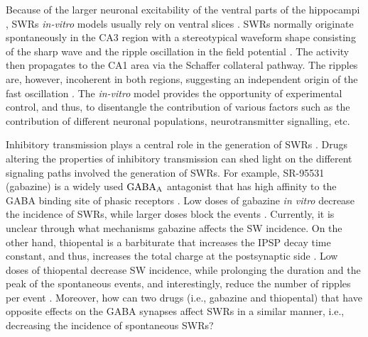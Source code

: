     Because of the larger neuronal excitability of the ventral parts of the
    hippocampi \citep{Dougherty2012}, SWRs \textit{in-vitro} models usually
    rely on ventral slices \citep[e.g.,][]{Maier2003, Nimmrich2005}. SWRs
    normally originate spontaneously in the CA3 region with a stereotypical
    waveform shape consisting of the sharp wave and the ripple oscillation in
    the field potential \citep{Csicsvari1999}. The activity then propagates to
    the CA1 area via the Schaffer collateral pathway. The ripples are, however,
    incoherent in both regions, suggesting an independent origin of the fast
    oscillation \citep{Csicsvari2000, Both2008}. The \textit{in-vitro} model
    provides the opportunity of experimental control, and thus, to disentangle
    the contribution of various factors such as the contribution of different
    neuronal populations, neurotransmitter signalling, etc.
    
    Inhibitory transmission plays a central role in the generation of SWRs
    \citep{Maier2003, Schlingloff2014}. Drugs altering the properties of
    inhibitory transmission can shed light on the different signaling paths
    involved the generation of SWRs. For example, SR-95531 (gabazine) is a
    widely used $\rm GABA_A$ antagonist that has high affinity to the GABA
    binding site of phasic receptors \citep{Ueno1997, Bai2001, Yeung2003}.  Low
    doses of gabazine \textit{in vitro} decrease the incidence of SWRs, while
    larger doses block the events \citep{Maier2003, Nimmrich2005,
    Ellender2010}. Currently, it is unclear through what mechanisms gabazine
    affects the SW incidence.
    On the other hand, thiopental is a barbiturate that increases the IPSP
    decay time constant, and thus, increases the total charge at the
    postsynaptic side \citep{Dickinson2002}.
    Low doses of thiopental decrease SW incidence, while prolonging the
    duration and the peak of the spontaneous events, and interestingly, reduce
    the number of ripples per event \citep{Papatheodoropoulos2007}. Moreover,
    how can two drugs (i.e., gabazine and thiopental) that have opposite
    effects on the GABA synapses affect SWRs in a similar manner, i.e.,
    decreasing the incidence of spontaneous SWRs?

